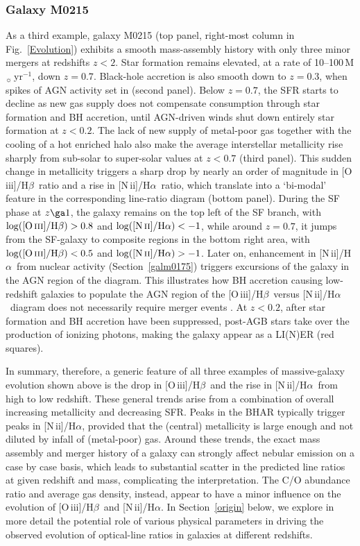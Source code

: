 \documentclass[fleqn,usenatbib]{mnras}
\newcommand{\Msun}{\hbox{M$_\sun$}}
\newcommand{\oiiihb}{\hbox{[O\,{\sc iii}]/H$\beta$}}
\newcommand{\niiha}{\hbox{[N\,{\sc ii}]/H$\alpha$}}
\begin{document}
\subsubsection{Galaxy M0215}\label{galm0215}

As a third example, galaxy M0215 (top panel, right-most column in
Fig.~\ref{Evolution})  exhibits a smooth mass-assembly history with
only three minor mergers at redshifts  $z<2$. Star formation remains
elevated, at a rate of 10--100\,\Msun\,yr$^{-1}$, down $z=0.7$.
Black-hole accretion is also smooth down to $z=0.3$, when spikes of
AGN activity set in  (second panel). Below $z=0.7$, the SFR starts to
decline as new gas supply does not compensate consumption through star
formation and BH accretion, until AGN-driven  winds shut down entirely
star formation at $z<0.2$. The lack of new supply of metal-poor gas
together with the cooling of a hot enriched halo also make the average
interstellar metallicity  rise sharply from sub-solar to super-solar
values at $z<0.7$ (third panel). This sudden change  in metallicity
triggers a sharp drop by nearly an order of magnitude in \oiiihb\
ratio and a rise in \niiha\ ratio, which translate into a `bi-modal'
feature in the corresponding line-ratio diagram (bottom panel). During
the SF phase at $z\ga1$, the galaxy remains on the top left of the SF
branch, with $\log(\oiiihb)> 0.8$  and $\log(\niiha)<-1$, while around
$z=0.7$, it jumps from the SF-galaxy to composite  regions in the 
bottom right area, with $\log(\oiiihb)< 0.5$ and $\log(\niiha)>-1$.
Later on,  enhancement in \niiha\ from nuclear activity
(Section~\ref{galm0175}) triggers excursions  of the galaxy in the AGN
region of the diagram. This illustrates how BH accretion causing
low-redshift galaxies to populate the AGN region of the \oiiihb\
versus \niiha\ diagram does not necessarily require merger events
\citep{Li08}. At $z<0.2$, after star formation  and BH accretion have
been suppressed, post-AGB stars take over the production of ionizing
photons, making the galaxy appear as a LI(N)ER (red squares). 

In summary, therefore, a generic feature of all three examples of
massive-galaxy  evolution shown above is the drop in \oiiihb\ and the
rise in \niiha\ from high to low redshift.  These general trends arise
from a combination of overall increasing metallicity and decreasing
SFR. Peaks in the BHAR typically trigger peaks in \niiha, provided
that the (central) metallicity  is large enough and not diluted by
infall of (metal-poor) gas. Around these trends, the exact mass
assembly and merger history of a galaxy can strongly affect nebular
emission on a case  by case basis, which leads to substantial scatter
in the predicted line ratios at given redshift and  mass, complicating
the interpretation. The C/O abundance ratio and average gas density,
instead,  appear to have a  minor influence on the evolution of
\oiiihb\ and \niiha. In Section~\ref{origin} below, we explore in more
detail the potential role of various physical parameters in driving
the observed evolution of optical-line ratios in galaxies at different
redshifts. 
\end{document}
